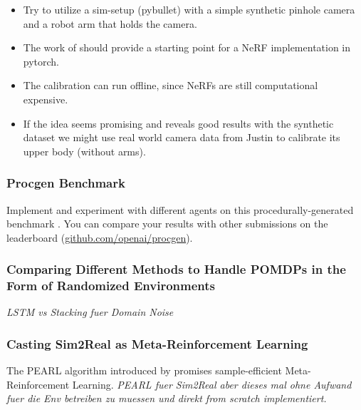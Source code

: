 \documentclass[a4paper]{article}
\begin{document}
\begin{itemize}
  \item Try to utilize a sim-setup (pybullet) with a simple synthetic pinhole camera and a robot arm that holds the camera.
  \item The work of \cite{SCNeRF2021} should provide a starting point for a NeRF implementation in pytorch.
  \item The calibration can run offline, since NeRFs are still computational expensive.
  \item If the idea seems promising and reveals good results with the synthetic dataset we might use real world camera data from Justin to calibrate its upper body (without arms).
\end{itemize}





\subsubsection{Procgen Benchmark}
Implement and experiment with different agents on this procedurally-generated benchmark \cite{procgen2020}. 
You can compare your results with other submissions on the leaderboard (\url{github.com/openai/procgen}).

\subsubsection{Comparing Different Methods to Handle POMDPs in the Form of Randomized Environments}
\textit{LSTM vs Stacking fuer Domain Noise}

\subsubsection{Casting Sim2Real as Meta-Reinforcement Learning}
The PEARL algorithm introduced by \cite{rakelly2019} promises sample-efficient Meta-Reinforcement Learning.
\textit{PEARL fuer Sim2Real aber dieses mal ohne Aufwand fuer die Env betreiben zu muessen und direkt from scratch implementiert.}



\end{document}
